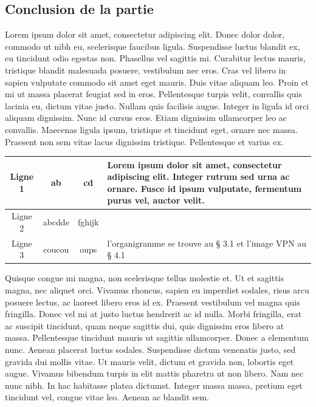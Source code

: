 \documentclass[a4paper,12pt]{report}
\begin{document}
\subsection{Conclusion de la partie} %
Lorem ipsum dolor sit amet, consectetur adipiscing elit. Donec dolor dolor, commodo ut nibh eu, scelerisque faucibus ligula. Suspendisse luctus blandit ex, eu tincidunt odio egestas non. Phasellus vel sagittis mi. Curabitur lectus mauris, tristique blandit malesuada posuere, vestibulum nec eros. Cras vel libero in sapien vulputate commodo sit amet eget mauris. Duis vitae aliquam leo. Proin et mi ut massa placerat feugiat sed in eros. Pellentesque turpis velit, convallis quis lacinia eu, dictum vitae justo. Nullam quis facilisis augue. Integer in ligula id orci aliquam dignissim. Nunc id cursus eros. Etiam dignissim ullamcorper leo ac convallis. Maecenas ligula ipsum, tristique et tincidunt eget, ornare nec massa. Praesent non sem vitae lacus dignissim tristique. Pellentesque et varius ex.
\\

\begin{table}[h]
    \centering
    \begin{tabularx}{\textwidth}{|c|c|c|X|}
    \rowcolor{gray!30} %
    \hline
    Ligne 1 & ab & cd & Lorem ipsum dolor sit amet, consectetur adipiscing elit. Integer rutrum sed urna ac ornare. Fusce id ipsum vulputate, fermentum purus vel, auctor velit. \\
    \hline
    Ligne 2 & \cellcolor{pink}abcdde & fghijk &  \\
    \hline
    Ligne 3 & coucou & \cellcolor{yellow}oups & l’organigramme se trouve au § 3.1 et l’image VPN au § 4.1 \\
    \hline
    \end{tabularx}
\end{table}


Quisque congue mi magna, non scelerisque tellus molestie et. Ut et sagittis magna, nec aliquet orci. Vivamus rhoncus, sapien eu imperdiet sodales, risus arcu posuere lectus, ac laoreet libero eros id ex. Praesent vestibulum vel magna quis fringilla. Donec vel mi at justo luctus hendrerit ac id nulla. Morbi fringilla, erat ac suscipit tincidunt, quam neque sagittis dui, quis dignissim eros libero at massa. Pellentesque tincidunt mauris ut sagittis ullamcorper. Donec a elementum nunc. Aenean placerat luctus sodales. Suspendisse dictum venenatis justo, sed gravida dui mollis vitae. Ut mauris velit, dictum et gravida non, lobortis eget augue. Vivamus bibendum turpis in elit mattis pharetra ut non libero. Nam nec nunc nibh. In hac habitasse platea dictumst. Integer massa massa, pretium eget tincidunt vel, congue vitae leo. Aenean ac blandit sem.
\end{document}
